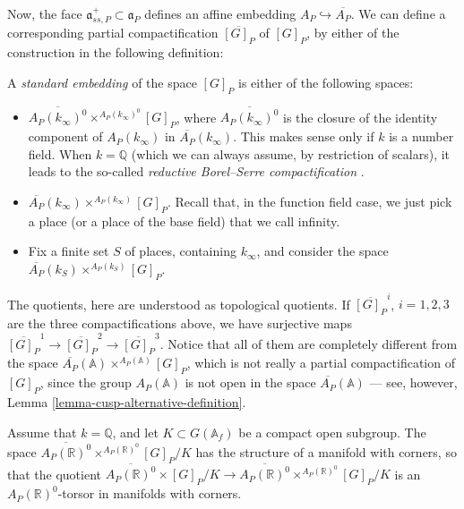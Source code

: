 Now, the face $\mathfrak a_{ss,P}^+\subset \mathfrak a_P$ defines an affine embedding $A_P \hookrightarrow \overline{A_P}$. We can define a corresponding partial compactification $\overline{[G]_P}$ of $[G]_P$, by either of the construction in the following definition:

\begin{definition}
 \label{definition-standard-embedding}
A {\it standard embedding} of the space $[G]_P$ is either of the following spaces:
\begin{itemize} 
 \item $\overline{A_P(k_\infty)^0} \times^{A_P(k_\infty)^0} [G]_P$, where $\overline{A_P(k_\infty)^0}$ is the closure of the identity component of $A_P(k_\infty)$ in $\overline{A_P}(k_\infty)$. This makes sense only if $k$ is a number field. When $k=\mathbb Q$ (which we can always assume, by restriction of scalars), it leads to the so-called \emph{reductive Borel--Serre compactification} \cite{Zucker-L2, Borel-Ji}. 
 \item $\overline{A_P}(k_\infty) \times^{A_P(k_\infty)} [G]_P$. Recall that, in the function field case, we just pick a place (or a place of the base field) that we call infinity.
 \item Fix a finite set $S$ of places, containing $k_\infty$, and consider the space $\overline{A_P}(k_S) \times^{A_P(k_S)} [G]_P$.
\end{itemize}
\end{definition}


The quotients, here are understood as topological quotients. If $\overline{[G]_P}^i$, $i=1, 2, 3$ are the three compactifications above, we have surjective maps $\overline{[G]_P}^1 \to \overline{[G]_P}^2 \to \overline{[G]_P}^3$. Notice that all of them are completely different from the space $\overline{A_P}(\mathbb A) \times^{A_P(\mathbb A)} [G]_P$, which is not really a partial compactification of $[G]_P$, since the group $A_P(\mathbb A)$ is not open in the space $\overline{A_P}(\mathbb A)$ --- see, however, Lemma \ref{lemma-cusp-alternative-definition}.

\begin{lemma}
 \label{lemma-manifold-corners}
Assume that $k=\mathbb Q$, and let $K\subset G(\mathbb A_f)$ be a compact open subgroup. The space $\overline{A_P(\mathbb R)^0} \times^{A_P(\mathbb R)^0} [G]_P/K$ has the structure of a manifold with corners, so that the quotient $\overline{A_P(\mathbb R)^0} \times [G]_P/K \to \overline{A_P(\mathbb R)^0} \times^{A_P(\mathbb R)^0} [G]_P/K$ is an ${A_P(\mathbb R)^0}$-torsor in manifolds with corners. 
\end{lemma}

